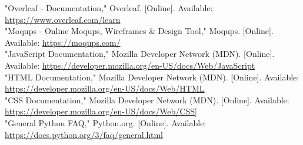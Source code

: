 \documentclass[conference]{IEEEtran}
\begin{document}
\begin{thebibliography}{00}
 "Overleaf - Documentation," Overleaf. [Online]. Available: \url{https://www.overleaf.com/learn}\\
 "Moqups - Online Moqups, Wireframes \& Design Tool," Moqups. [Online]. Available: \url{https://moqups.com/}\\
 "JavaScript Documentation," Mozilla Developer Network (MDN). [Online]. Available: \url{https://developer.mozilla.org/en-US/docs/Web/JavaScript}\\
 "HTML Documentation," Mozilla Developer Network (MDN). [Online]. Available: \url{https://developer.mozilla.org/en-US/docs/Web/HTML}\\
 "CSS Documentation," Mozilla Developer Network (MDN). [Online]. Available: \url{https://developer.mozilla.org/en-US/docs/Web/CSS]}\\
 "General Python FAQ," Python.org. [Online]. Available: \url{https://docs.python.org/3/faq/general.html}\\
\end{thebibliography}
\end{document}
